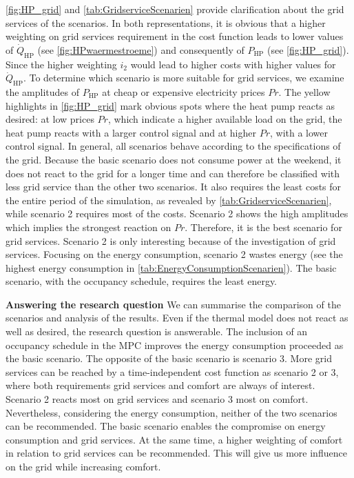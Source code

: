 \autoref{fig:HP_grid} and \autoref{tab:GridserviceScenarien} provide clarification about the grid services of the scenarios. In both representations, it is obvious that a higher weighting on grid services requirement in the cost function leads to lower values of $\dot{Q}_\text{HP}$ (see \autoref{fig:HPwaermestroeme}) and consequently of $P_\text{HP}$ (see \autoref{fig:HP_grid}). Since the higher weighting $i_\text{2}$ would lead to higher costs with higher values for $\dot{Q}_\text{HP}$. To determine which scenario is more suitable for grid services, we examine the amplitudes of $P_\text{HP}$ at cheap or expensive electricity prices $Pr$. The yellow highlights in \autoref{fig:HP_grid} mark obvious spots where the heat pump reacts as desired: at low prices $Pr$, which indicate a higher available load on the grid, the heat pump reacts with a larger control signal and at higher $Pr$, with a lower control signal. In general, all scenarios behave according to the specifications of the grid. Because the basic scenario does not consume power at the weekend, it does not react to the grid for a longer time and can therefore be classified with less grid service than the other two scenarios. It also requires the least costs for the entire period of the simulation, as revealed by \autoref{tab:GridserviceScenarien}, while scenario 2 requires most of the costs. Scenario 2 shows the high amplitudes which implies the strongest reaction on $Pr$. Therefore, it is the best scenario for grid services. Scenario 2 is only interesting because of the investigation of grid services. Focusing on the energy consumption, scenario 2 wastes energy (see the highest energy consumption in \autoref{tab:EnergyConsumptionScenarien}). The basic scenario, with the occupancy schedule, requires the least energy. \newline

\textbf{Answering the research question}\newline
We can summarise the comparison of the scenarios and analysis of the results. Even if the thermal model does not react as well as desired, the research question is answerable. The inclusion of an occupancy schedule in the MPC improves the energy consumption proceeded as the basic scenario. The opposite of the basic scenario is scenario 3. More grid services can be reached by a time-independent cost function as scenario 2 or 3, where both requirements grid services and comfort are always of interest. Scenario 2 reacts most on grid services and scenario 3 most on comfort. Nevertheless, considering the energy consumption, neither of the two scenarios can be recommended. The basic scenario enables the compromise on energy consumption and grid services. At the same time, a higher weighting of comfort in relation to grid services can be recommended. This will give us more influence on the grid while increasing comfort.  

